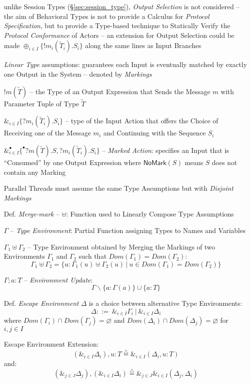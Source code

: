 \fist unlike Session Types (\S\ref{sec:session_type}), \emph{Output
  Selection} is not considered -- the aim of Behavioral Types is not
to provide a Calculus for \emph{Protocol Specification}, but to
provide a Type-based technique to Statically Verify the \emph{Protocol
  Conformance} of Actors -- an extension for Output Selection could be
made $\oplus_{i \in I}\{ !m_i(\tilde{T}_i).S_i \}$ along the same
lines as Input Branches

\emph{Linear Type} assumptions: guarantees each Input is eventually
matched by exactly one Output in the System -- denoted by
\emph{Markings}

$!m(\tilde{T})$ -- the Type of an Output Expression that Sends the
Message $m$ with Parameter Tuple of Type $\tilde{T}$

$\&_{i \in I}\{ ?m_i(\tilde{T}_i).S_i \}$ -- type of the Input Action
that offers the Choice of Receiving one of the Message $m_i$ and
Continuing with the Sequence $S_i$

$\&^\bullet_{i \in I} \{^\bullet ?m (\tilde{T}).S,
?m_i(\tilde{T}_i).S_i \}$ -- \emph{Marked Action}: specifies an Input
that is ``Consumed'' by one Output Expression where
$\mathsf{NoMark}(S)$ means $S$ does not contain any Marking %

Parallel Threads must assume the same Type Assumptions but with
\emph{Disjoint Markings}

Def. \emph{Merge-mark} -- $\uplus$: Function used to Linearly Compose
Type Assumptions %

$\Gamma$ -- \emph{Type Environment}: Partial Function assigning Types
to Names and Variables

$\Gamma_1 \uplus \Gamma_2$ -- Type Environment obtained by Merging the
Markings of two Environments $\Gamma_1$ and $\Gamma_2$ such that
$Dom(\Gamma_1) = Dom(\Gamma_2)$:
\[
  \Gamma_1 \uplus \Gamma_2 =
    \{ u:\Gamma_1(u) \uplus \Gamma_2(u)
    \ |\ u \in Dom(\Gamma_1) = Dom(\Gamma_2) \}
\]

$\Gamma;a:T$ -- \emph{Environment Update}:
\[
  \Gamma \backslash \{a:\Gamma(a)\} \cup \{a:T\}
\]

Def. \emph{Escape Environment} $\Delta$ is a choice between
alternative Type Environments:
\[
  \Delta ::=\ \&_{i \in I}\Gamma_i \ |\ \&_{i \in I}\Delta_i
\]
where $Dom(\Gamma_i) \cap Dom(\Gamma_j) = \varnothing$ and
$Dom(\Delta_i) \cap Dom(\Delta_j) = \varnothing$ for $i,j \in I$

Escape Environment Extension:
\[
  (\&_{i \in I}\Delta_i), u:T \overset{\triangle}{=}
    \&_{i \in I}(\Delta_i, u:T)
\]
and:
\[
  (\&_{j \in J}\Delta_j), (\&_{i \in I}\Delta_i) \overset{\triangle}{=}
    \&_{j \in J}\&_{i \in I}(\Delta_j, \Delta_i)
\]

